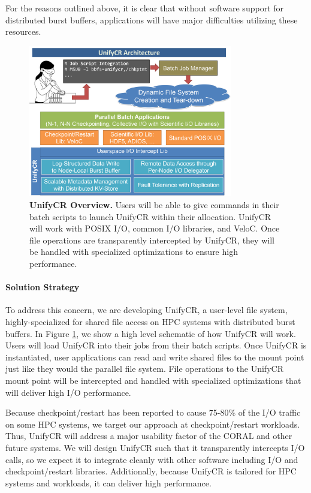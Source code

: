 For the reasons outlined above, it is clear that without software support 
for distributed burst buffers, applications
will have major difficulties utilizing these resources. 

\begin{figure}[htb]
        \centering
        \includegraphics[width=3.5in]{projects/2.3.4-DataViz/2.3.4.07-UNIFYCR/UnifyCR-overview}
        \caption{\label{fig:unifycr-overview} \textbf{UnifyCR Overview.} Users will be able to give commands in their batch scripts to launch UnifyCR within
their allocation. UnifyCR will work with POSIX I/O, common I/O libraries, and
VeloC. Once file operations are transparently intercepted by UnifyCR, they
will be handled with specialized optimizations to ensure high performance.}
\end{figure}

\paragraph{Solution Strategy}

To address this concern, we are developing UnifyCR, a user-level file system,
highly-specialized for shared file access on HPC systems with distributed
burst buffers. In Figure \ref{fig:unifycr-overview}, we show a high
level schematic of how UnifyCR will work. Users will load UnifyCR into
their jobs from their batch scripts. Once UnifyCR is instantiated, user
applications can read and write shared files to the mount point just like
they would the parallel file system. File operations to the UnifyCR
mount point will be intercepted and handled with specialized optimizations
that will deliver high I/O performance. 

Because checkpoint/restart has been reported to cause 75-80\%
of the I/O traffic on some HPC systems, we target our approach at
checkpoint/restart workloads. Thus, UnifyCR will address a major usability
factor of the CORAL and other future systems. We will design UnifyCR such
that it transparently intercepts I/O calls, so we expect it to integrate
cleanly with other software including I/O and checkpoint/restart libraries.
Additionally, because UnifyCR is tailored for HPC systems and workloads,
it can deliver high performance.



